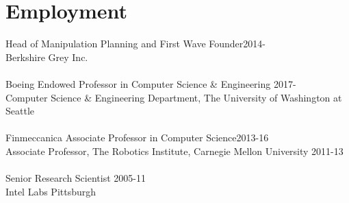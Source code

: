
\section{Employment}
\noindent
\ifBG
Head of Manipulation Planning and First Wave Founder\hfill 2014-\\
Berkshire Grey Inc.\\
\\
\fi
Boeing Endowed Professor in Computer Science \& Engineering \hfill 2017-\\
Computer Science \& Engineering Department, 
The University of Washington at Seattle\\
\\
Finmeccanica Associate Professor in Computer Science\hfill 2013-16\\
Associate Professor, 
The Robotics Institute,  Carnegie Mellon University
\hfill 2011-13\\
\\
Senior Research Scientist \hfill 2005-11\\
Intel Labs Pittsburgh\\
